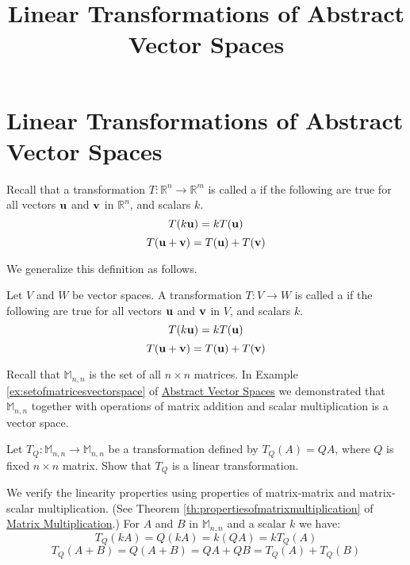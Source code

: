 \documentclass{ximera}
\title{Linear Transformations of Abstract Vector Spaces} \license{CC BY-NC-SA 4.0}
\begin{document}
\begin{abstract}
\end{abstract}
\maketitle

\section*{Linear Transformations of Abstract Vector Spaces}

Recall that a transformation $T:\mathbb{R}^n\rightarrow \mathbb{R}^m$ is called a  if the following are true for all vectors ${\bf u}$ and ${\bf v}$ in $\mathbb{R}^n$, and scalars $k$.
\begin{equation*}
T(k{\bf u})= kT({\bf u})
\end{equation*}
\begin{equation*}
T({\bf u}+{\bf v})= T({\bf u})+T({\bf v})
\end{equation*}

We generalize this definition as follows.

\begin{definition}\label{def:lintransgeneral}
Let $V$ and $W$ be vector spaces. A transformation $T:V\rightarrow W$ is called a  if the following are true for all vectors ${\bf u}$ and ${\bf v}$ in $V$, and scalars $k$.
\begin{equation*}
T(k{\bf u})= kT({\bf u})
\end{equation*}
\begin{equation*}
T({\bf u}+{\bf v})= T({\bf u})+T({\bf v})
\end{equation*}
\end{definition}

\begin{example}\label{ex:abstvectsplintransM22}
Recall that $\mathbb{M}_{n,n}$ is the set of all $n\times n$ matrices.  In Example \ref{ex:setofmatricesvectorspace} of \href{\xmbaseurl/VSP-0050/main}{Abstract Vector Spaces} we demonstrated that $\mathbb{M}_{n,n}$ together with operations of matrix addition and scalar multiplication is a vector space.

Let $T_Q:\mathbb{M}_{n,n}\rightarrow \mathbb{M}_{n,n}$ be a transformation defined by $T_Q(A)=QA$, where $Q$ is fixed $n\times n$ matrix.  Show that $T_Q$ is a linear transformation.
\begin{explanation}
We verify the linearity properties using properties of matrix-matrix and matrix-scalar multiplication.  (See Theorem \ref{th:propertiesofmatrixmultiplication} of \href{\xmbaseurl/MAT-0020/main}{Matrix Multiplication}.)  For $A$ and $B$ in $\mathbb{M}_{n,n}$ and a scalar $k$ we have:
$$T_Q(kA)=Q(kA)=k(QA)=kT_Q(A)$$
$$T_Q(A+B)=Q(A+B)=QA+QB=T_Q(A)+T_Q(B)$$
\end{explanation}
\end{example}
\end{document}
